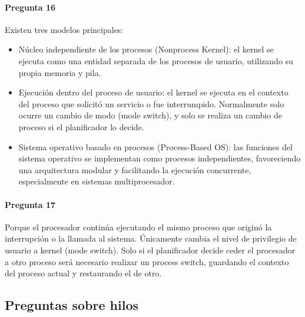 \paragraph{Pregunta 16}
Existen tres modelos principales:
\begin{itemize}
  \item Núcleo independiente de los procesos (Nonprocess Kernel): el kernel se ejecuta como una entidad separada de los procesos de usuario, utilizando su propia memoria y pila.
  \item Ejecución dentro del proceso de usuario: el kernel se ejecuta en el contexto del proceso que solicitó un servicio o fue interrumpido. Normalmente solo ocurre un cambio de modo (mode switch), y solo se realiza un cambio de proceso si el planificador lo decide.
  \item Sistema operativo basado en procesos (Process-Based OS): las funciones del sistema operativo se implementan como procesos independientes, favoreciendo una arquitectura modular y facilitando la ejecución concurrente, especialmente en sistemas multiprocesador.
\end{itemize}

\paragraph{Pregunta 17}
Porque el procesador continúa ejecutando el mismo proceso que originó la interrupción o la llamada al sistema. Únicamente cambia el nivel de privilegio de usuario a kernel (mode switch). Solo si el planificador decide ceder el procesador a otro proceso será necesario realizar un process switch, guardando el contexto del proceso actual y restaurando el de otro.

\subsection{Preguntas sobre hilos}

